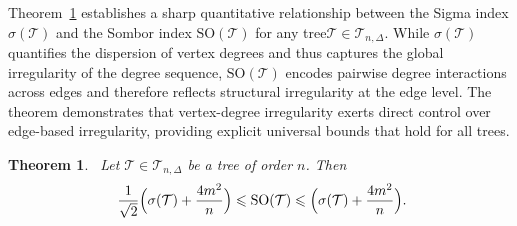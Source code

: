 \documentclass[12pt, a4paper]{article}
\newtheorem{theorem}{Theorem}[section]
\newcommand{\TT}{\mathcal{T}}
\newcommand{\SO}{\mathrm{SO}}
\begin{document}
Theorem~\ref{ThmSomborn2} establishes a sharp quantitative relationship between the Sigma index $\sigma(\TT)$ and the Sombor index $\SO(\TT)$ for any tree$\TT\in \mathcal{T}_{n,\Delta}$. While $\sigma(\TT)$ quantifies the dispersion of vertex degrees and thus captures the global irregularity of the degree sequence, $\SO(\TT)$ encodes pairwise degree interactions across edges and therefore reflects structural irregularity at the edge level. The theorem demonstrates that vertex-degree irregularity exerts direct control over edge-based irregularity, providing explicit universal bounds that hold for all trees. 

\begin{theorem}~\label{ThmSomborn2}
Let $\TT\in \mathcal{T}_{n,\Delta}$ be a tree of order $n$.
Then
\begin{equation}~\label{eqq1ThmSomborn2}
\frac{1}{\sqrt{2}}\Bigl(\sigma(\TT)+\frac{4m^2}{n}\Bigr) \leqslant \SO(\TT)\leqslant\Bigl(\sigma(\TT)+\frac{4m^2}{n}\Bigr).
\end{equation}
\end{theorem}
\end{document}
